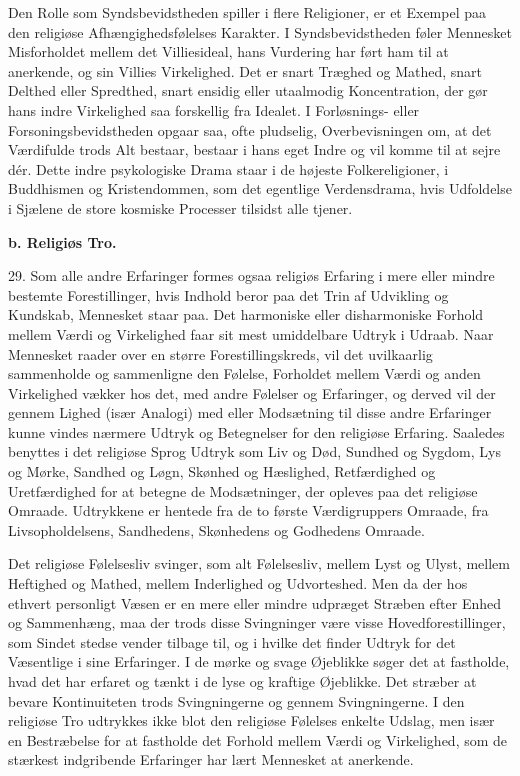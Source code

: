 \documentclass[12pt,a4paper,openany]{book}
\newcommand{\opage}[1]{\marginnote{\footnotesize\textit{[#1]}}}
\begin{document}
Den Rolle som Syndsbevidstheden spiller i flere Religioner, er et
Exempel paa den religiøse Afhængighedsfølelses Karakter. I
Syndsbevidstheden føler Mennesket Misforholdet mellem det Villiesideal,
hans Vurdering har ført ham til at anerkende, og sin Villies
Virkelighed. Det er snart Træghed og Mathed, snart Delthed eller
Spredthed, snart ensidig eller utaalmodig Koncentration, der gør hans
indre Virkelighed saa forskellig fra Idealet. I Forløsnings- eller
Forsoningsbevidstheden opgaar saa, ofte pludselig, Overbevisningen om,
at det Værdifulde trods Alt bestaar, bestaar i hans eget Indre og vil
komme til at sejre dér. Dette indre psykologiske Drama staar i de
højeste Folkereligioner, i Buddhismen og Kristendommen, som det
egentlige Verdensdrama, hvis Udfoldelse i Sjælene de store kosmiske
Processer tilsidst alle tjener.

\begin{center}\textbf{b. Religiøs Tro.}\end{center}

29. Som alle andre Erfaringer formes ogsaa religiøs Erfaring i mere
eller mindre bestemte Forestillinger, hvis Indhold beror paa det Trin af
Udvikling og Kundskab, Mennesket staar paa. Det harmoniske eller
disharmoniske Forhold mellem Værdi og Virkelighed faar sit mest
umiddelbare Udtryk i Udraab. Naar Mennesket raader over en større
Forestillingskreds, vil det uvilkaarlig sammenholde og sammenligne den
Følelse, Forholdet mellem Værdi og anden Virkelighed vækker hos det, med
andre Følelser og Erfaringer, og derved vil der gennem Lighed (især
Analogi) med eller Modsætning til disse andre Erfaringer kunne vindes
nærmere Udtryk og Betegnelser for den religiøse Erfaring. Saaledes
benyttes i det religiøse Sprog Udtryk som Liv og Død,
\opage{70}Sundhed og Sygdom, Lys og Mørke, Sandhed og Løgn, Skønhed og
Hæslighed, Retfærdighed og Uretfærdighed for at betegne de Modsætninger,
der opleves paa det religiøse Omraade. Udtrykkene er hentede fra de to
første Værdigruppers Omraade, fra Livsopholdelsens, Sandhedens,
Skønhedens og Godhedens Omraade.

Det religiøse Følelsesliv svinger, som alt Følelsesliv, mellem Lyst og
Ulyst, mellem Heftighed og Mathed, mellem Inderlighed og Udvorteshed.
Men da der hos ethvert personligt Væsen er en mere eller mindre udpræget
Stræben efter Enhed og Sammenhæng, maa der trods disse Svingninger være
visse Hovedforestillinger, som Sindet stedse vender tilbage til, og i
hvilke det finder Udtryk for det Væsentlige i sine Erfaringer. I de
mørke og svage Øjeblikke søger det at fastholde, hvad det har erfaret og
tænkt i de lyse og kraftige Øjeblikke. Det stræber at bevare
Kontinuiteten trods Svingningerne og gennem Svingningerne. I den
religiøse Tro udtrykkes ikke blot den religiøse Følelses enkelte Udslag,
men især en Bestræbelse for at fastholde det Forhold mellem Værdi og
Virkelighed, som de stærkest indgribende Erfaringer har lært Mennesket
at anerkende.
\end{document}
